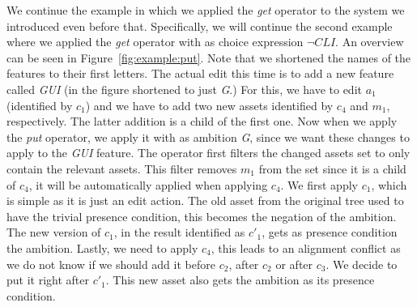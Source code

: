 \begin{example}
  We continue the example in which we applied the \emph{get} operator to the
  system we introduced even before that. Specifically, we will continue the
  second example where we applied the \emph{get} operator with as choice
  expression \(\neg\mathit{CLI}\). An overview can be seen in Figure~\ref{fig:example:put}.
  Note that we shortened the names of the features to their first letters.
The actual edit this time is to add a new feature called \emph{GUI} (in the
figure shortened to just \emph{G}.) For this, we have to edit $a_1$ (identified
by $c_1$) and we have to add two new assets identified by $c_4$ and $m_1$,
respectively. The latter addition is a child of the first one. Now when we apply
the \emph{put} operator, we apply it with as ambition \emph{G}, since we want
these changes to apply to the \emph{GUI} feature. The operator first filters the
changed assets set to only contain the relevant assets. This filter removes $m_1$
from the set since it is a child of $c_4$, it will be automatically applied when
applying $c_4$. We first apply $c_1$, which is simple as it is just an edit action.
The old asset from the original tree used to have the trivial presence condition,
this becomes the negation of the ambition. The new version of $c_1$, in the result
identified as $c'_1$, gets as presence condition the ambition. Lastly, we need to
apply $c_4$, this leads to an alignment conflict as we do not know if we should add
it before $c_2$, after $c_2$ or after $c_3$. We decide to put it right after $c'_1$.
This new asset also gets the ambition as its presence condition.
\end{example}